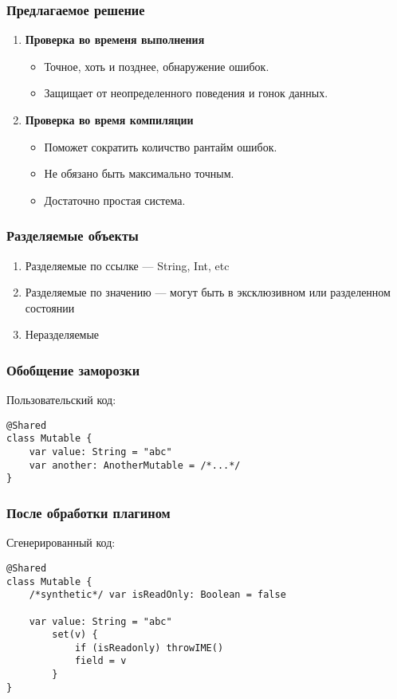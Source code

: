 \documentclass[14pt,xcolor={dvipsnames}]{beamer}
\begin{document}
\begin{frame}
\frametitle{Предлагаемое решение}
\begin{enumerate}
  \item \textbf{Проверка во временя выполнения}
  \begin{itemize}
    \item Точное, хоть и позднее, обнаружение ошибок.
    \item Защищает от неопределенного поведения и гонок данных.
  \end{itemize}
  \item \textbf{Проверка во время компиляции}
  \begin{itemize}
    \item Поможет сократить количство рантайм ошибок.
    \item Не обязано быть максимально точным.
    \item Достаточно простая система.
  \end{itemize}
\end{enumerate}
\end{frame}

\begin{frame}
\frametitle{Разделяемые объекты}
\begin{enumerate}
	\item Разделяемые по ссылке --- String, Int, etc
	\item Разделяемые по значению --- могут быть в эксклюзивном или разделенном состоянии
	\item Неразделяемые
\end{enumerate}
\end{frame}

\begin{frame}[fragile]
\frametitle{Обобщение заморозки}
Пользовательский код:
\vspace{20pt}
\begin{lstlisting}[basicstyle=\small\ttfamily]
@Shared
class Mutable {
	var value: String = "abc"
	var another: AnotherMutable = /*...*/
}
\end{lstlisting}
\end{frame}

\begin{frame}[fragile]
\frametitle{После обработки плагином}
Сгенерированный код:
\begin{lstlisting}[basicstyle=\fontsize{10}{1}\selectfont\ttfamily]
@Shared
class Mutable {
	/*synthetic*/ var isReadOnly: Boolean = false
	
	var value: String = "abc"
		set(v) {
			if (isReadonly) throwIME() 
			field = v
		}
}
\end{lstlisting}
\end{frame}
\end{document}
